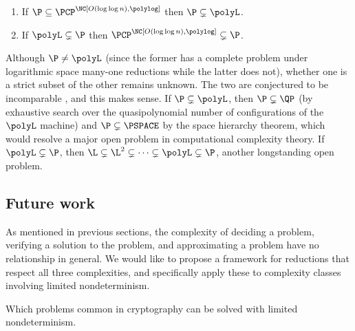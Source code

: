\documentclass{article}
\begin{document}
\begin{theorem}\label{thm:pinpcp}
  \mbox{}
  \begin{enumerate}
  \item If $\P \subseteq \PCP^\NC[O(\log \log n), \polylog]$ then $\P \subsetneq \polyL$.
  \item If $\polyL \subsetneq \P$ then $\PCP^\NC[O(\log \log n), \polylog] \subsetneq \P$.
  \end{enumerate}
\end{theorem}
Although $\P \neq \polyL$ (since the former has a complete problem under logarithmic space many-one reductions while the latter does not), whether one is a strict subset of the other remains unknown.
The two are conjectured to be incomparable \autocite[Section~2.5.1]{johnson90}, and this makes sense.
If $\P \subsetneq \polyL$, then $\P \subsetneq \QP$ (by exhaustive search over the quasipolynomial number of configurations of the $\polyL$ machine) and $\P \subsetneq \PSPACE$ by the space hierarchy theorem, which would resolve a major open problem in computational complexity theory.
If $\polyL \subsetneq \P$, then $\L \subsetneq \L^2 \subsetneq \dotsb \subsetneq \polyL \subsetneq \P$, another longstanding open problem.

\subsection{Future work}

\begin{description}[style=nextline]
\item[Reductions respecting verification complexity \autocite{limndver}]
  As mentioned in previous sections, the complexity of deciding a problem, verifying a solution to the problem, and approximating a problem have no relationship in general.
  We would like to propose a framework for reductions that respect all three complexities, and specifically apply these to complexity classes involving limited nondeterminism.
\item[Cryptographic primitives in limited nondeterminism \autocite{timelock}]
  Which problems common in cryptography can be solved with limited nondeterminism.
\end{description}


\end{document}

